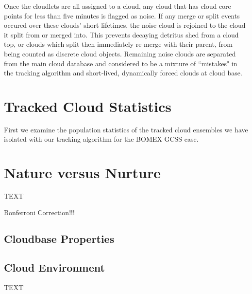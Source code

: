 \documentclass[acp]{copernicus}
\begin{document}
Once the cloudlets are all assigned to a cloud, any cloud that has cloud core 
points for less than five minutes is flagged as noise.  If any merge or split 
events occured over these clouds' short lifetimes, the noise cloud is rejoined 
to the cloud it split from or merged into.  This prevents decaying detritus shed 
from a cloud top, or clouds which split then immediately re-merge with their 
parent, from being counted as discrete cloud objects.  Remaining noise clouds 
are separated from the main cloud database and considered to be a mixture of 
``mistakes" in the tracking algorithm and short-lived, dynamically forced clouds 
at cloud base.



\section{Tracked Cloud Statistics}

First we examine the population statistics of the tracked cloud ensembles we 
have isolated with our tracking algorithm for the BOMEX GCSS case.



\section{Nature versus Nurture}
TEXT

Bonferroni Correction!!!

\subsection{Cloudbase Properties}

\subsection{Cloud Environment}


\conclusions
TEXT


\end{document}
